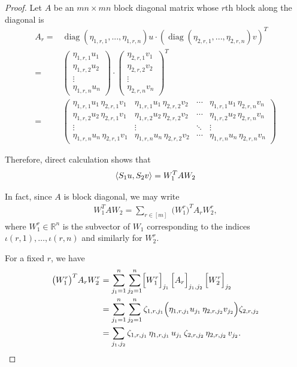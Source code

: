 \documentclass[11pt]{amsart}
\numberwithin{equation}{section}
\numberwithin{equation}{section}
\DeclareMathOperator*{\diag}{diag}
\DeclarePairedDelimiter{\ip}{\langle}{\rangle}
\begin{document}
\begin{proof}
Let $A$ be an $mn \times mn$ block diagonal matrix whose $r$th block along the diagonal is
\begin{align*}
A_r=&\diag(\eta_{1,r,1},...,\eta_{1,r,n})u \cdot (\diag(\eta_{2,r,1},...,\eta_{2,r,n})v)^T
    \\=&\begin{pmatrix} \eta_{1,r,1} u_1 \\ \eta_{1,r,2} u_2 \\ \vdots \\ \eta_{1,r,n} u_n \end{pmatrix} \cdot  \begin{pmatrix} \eta_{2,r,1} v_1 \\ \eta_{2,r,2} v_2 \\ \vdots \\ \eta_{2,r,n} v_n \end{pmatrix}^T
    \\=&\begin{pmatrix}
\eta_{1,r,1}u_1 \, \eta_{2,r,1}v_1 & \eta_{1,r,1}u_1 \, \eta_{2,r,2}v_2 & \cdots & \eta_{1,r,1}u_1 \, \eta_{2,r,n}v_n \\
\eta_{1,r,2}u_2 \, \eta_{2,r,1}v_1 & \eta_{1,r,2}u_2 \, \eta_{2,r,2}v_2 & \cdots & \eta_{1,r,2}u_2 \, \eta_{2,r,n}v_n \\
\vdots & \vdots & \ddots & \vdots \\
\eta_{1,r,n}u_n \, \eta_{2,r,1}v_1 & \eta_{1,r,n}u_n \, \eta_{2,r,2}v_2 & \cdots & \eta_{1,r,n}u_n \, \eta_{2,r,n}v_n
\end{pmatrix}
\end{align*}

Therefore, direct calculation shows that
\begin{align*}
    \ip{S_1u,S_2v}=W_1^TAW_2
\end{align*}

In fact, since \(A\) is block diagonal, we may write
	\begin{align*}
		W_1^T A W_2 = \sum_{r \in [m]} \; \bigl(W_1^r\bigr)^T A_r W_2^r,
	\end{align*}
	where \(W_1^r \in \mathbb{R}^n\) is the subvector of \(W_1\) corresponding to the indices \(\iota(r,1), \dots, \iota(r,n)\) and similarly for \(W_2^r\).
	
	For a fixed \(r\), we have
	\begin{align*}
		\bigl(W_1^r\bigr)^T A_r W_2^r 
		&= \sum_{j_1=1}^n \sum_{j_2=1}^n \Bigl[W_1^r\Bigr]_{j_1} \, \Bigl[A_r\Bigr]_{j_1,j_2} \, \Bigl[W_2^r\Bigr]_{j_2} \\
		&= \sum_{j_1=1}^n \sum_{j_2=1}^n \zeta_{1,r,j_1} \Bigl( \eta_{1,r,j_1} u_{j_1} \, \eta_{2,r,j_2} v_{j_2} \Bigr) \zeta_{2,r,j_2} \\
		&= \sum_{j_1,j_2} \zeta_{1,r,j_1}\,\eta_{1,r,j_1}\, u_{j_1} \, \zeta_{2,r,j_2}\,\eta_{2,r,j_2}\, v_{j_2}.
	\end{align*}
	

\end{proof}
\end{document}
